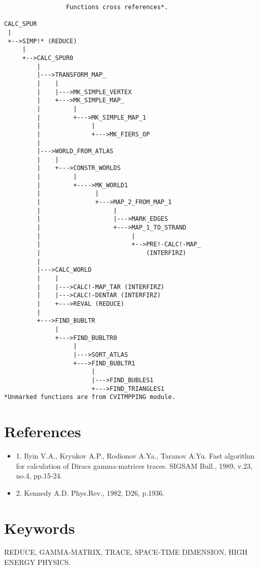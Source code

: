 \begin{verbatim}
                 Functions cross references*.

CALC_SPUR
 |
 +-->SIMP!* (REDUCE)
     |
     +-->CALC_SPUR0
         |
         |--->TRANSFORM_MAP_
         |    |
         |    |--->MK_SIMPLE_VERTEX
         |    +--->MK_SIMPLE_MAP_
         |         |
         |         +--->MK_SIMPLE_MAP_1
         |              |
         |              +--->MK_FIERS_OP
         |
         |--->WORLD_FROM_ATLAS
         |    |
         |    +--->CONSTR_WORLDS
         |         |
         |         +---->MK_WORLD1
         |               |
         |               +--->MAP_2_FROM_MAP_1
         |                    |
         |                    |--->MARK_EDGES
         |                    +--->MAP_1_TO_STRAND
         |                         |
         |                         +-->PRE!-CALC!-MAP_
         |                             (INTERFIRZ)
         |
         |--->CALC_WORLD
         |    |
         |    |--->CALC!-MAP_TAR (INTERFIRZ)
         |    |--->CALC!-DENTAR (INTERFIRZ)
         |    +--->REVAL (REDUCE)
         |
         +--->FIND_BUBLTR
              |
              +--->FIND_BUBLTR0
                   |
                   |--->SORT_ATLAS
                   +--->FIND_BUBLTR1
                        |
                        |--->FIND_BUBLES1
                        +--->FIND_TRIANGLES1
*Unmarked functions are from CVITMPPING module.

\end{verbatim}


\section*{References}

\begin{itemize}

\item{1.}
Ilyin V.A., Kryukov A.P., Rodionov A.Ya., Taranov A.Yu.
Fast algorithm for calculation of Diracs gamma-matrices
traces. SIGSAM Bull., 1989, v.23, no.4, pp.15-24.

\item{2.}
Kennedy A.D. Phys.Rev., 1982, D26, p.1936.
\end{itemize}

\section*{Keywords}

REDUCE, GAMMA-MATRIX,  TRACE, SPACE-TIME  DIMENSION, HIGH  ENERGY PHYSICS.


